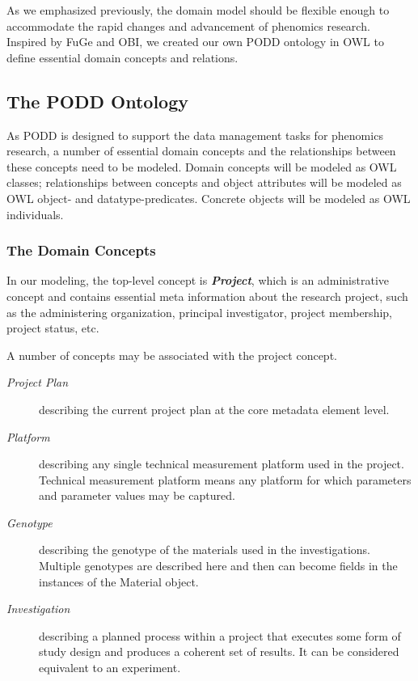 \documentclass{llncs}
\begin{document}
As we emphasized previously, the domain model should be flexible
enough to accommodate the rapid changes and advancement of phenomics
research. Inspired by FuGe and OBI, we created our own PODD ontology
in OWL to define essential domain concepts and relations.

\subsection{The PODD Ontology}
As PODD is designed to support the data management tasks for
phenomics research, a number of essential domain concepts and the
relationships between these concepts need to be modeled. Domain
concepts will be modeled as OWL classes; relationships between
concepts and object attributes will be modeled as OWL object- and
datatype-predicates. Concrete objects will be modeled as OWL
individuals.

\subsubsection{The Domain Concepts} In our modeling, the top-level
concept is \textbf{\emph{Project}}, which is an administrative
concept and contains essential meta information about the research
project, such as the administering organization, principal
investigator, project membership, project status, etc.

A number of concepts may be associated with the project concept.

\begin{description}
\item[\emph{Project Plan}] describing the
current project plan at the core metadata element level.

\item[\emph{Platform}] describing any single technical
measurement platform used in the project. Technical measurement
platform means any platform for which parameters and parameter
values may be captured.

\item[\emph{Genotype}] describing the genotype of the
materials used in the investigations. Multiple genotypes are
described here and then can become fields in the instances of the
Material object.

\item[\emph{Investigation}] describing a planned process
within a project that executes some form of study design and
produces a coherent set of results. It can be considered equivalent
to an experiment.
\end{description}
\end{document}
